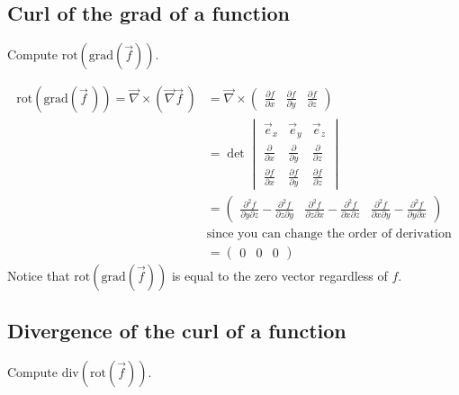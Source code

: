   \subsection{Curl of the grad of a function}
  Compute $\text{rot}(\text{grad}(\vec f))$.

  \begin{align*}
  \text{rot}(\text{grad}(\vec f \,)) = \vec\nabla \times \left(\vec\nabla \vec f\,\right) 
    & = 
      \vec\nabla \times
      \begin{pmatrix} 
        \frac{\partial f}{\partial x} &
        \frac{\partial f}{\partial y} &
        \frac{\partial f}{\partial z} 
      \end{pmatrix} \\
    & = \det
      \begin{vmatrix} 
        \vec e_x & \vec e_y & \vec e_z \\[6pt]
        \frac{\partial}{\partial x} & 
        \frac{\partial}{\partial y} & 
        \frac{\partial}{\partial z} \\[6pt]
        \frac{\partial f}{\partial x} &
        \frac{\partial f}{\partial y} &
        \frac{\partial f}{\partial z} 
      \end{vmatrix} \\
    & = 
      \begin{pmatrix} 
        \frac{\partial^2 f}{\partial y \partial z} - \frac{\partial^2 f}{\partial z \partial y} &
        \frac{\partial^2 f}{\partial z \partial x} - \frac{\partial^2 f}{\partial x \partial z} &
        \frac{\partial^2 f}{\partial x \partial y} - \frac{\partial^2 f}{\partial y \partial x}
      \end{pmatrix} \\
    & \text{since you can change the order of derivation} \\
    & = 
      \begin{pmatrix}
        0 & 0 & 0
      \end{pmatrix}
  \end{align*}
  Notice that $\text{rot}(\text{grad}(\vec f))$ is equal to the zero vector regardless of $f$.

  \subsection{Divergence of the curl of a function}
  Compute $\text{div}(\text{rot}(\vec f))$.


